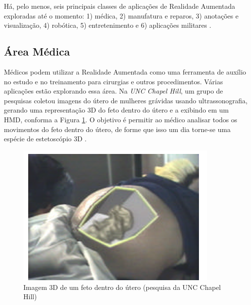 % 
% 




Há, pelo menos, seis principais classes de aplicações de 
Realidade Aumentada exploradas até o momento: 1) médica, 2) manufatura e reparos,
3) anotações e visualização, 4) robótica, 5) entretenimento e 6) aplicações militares \cite{SurveyAR}.


\subsection{Área Médica}

Médicos podem utilizar a Realidade Aumentada como uma ferramenta de auxílio
no estudo e no treinamento para cirurgias e outros procedimentos. Várias 
aplicações estão explorando essa área. Na \textit{UNC Chapel Hill}, um grupo
de pesquisas coletou imagens do útero de mulheres grávidas usando ultrassonografia,
gerando uma representação 3D do feto dentro do útero e a exibindo em um \gls{HMD}, 
conforma a Figura \ref{fig:feto_utero_3d}. O objetivo é permitir ao médico analisar todos os movimentos
do feto dentro do útero, de forme que isso um dia torne-se uma espécie de estetoscópio 3D \cite{Feto3D}.

\begin{figure}[h!]
    \centering
    \caption{Imagem 3D de um feto dentro do útero (pesquisa da UNC Chapel Hill)}
    \label{fig:feto_utero_3d}
    \includegraphics[width=10cm]{resources/feto-3d.png}
\end{figure}



